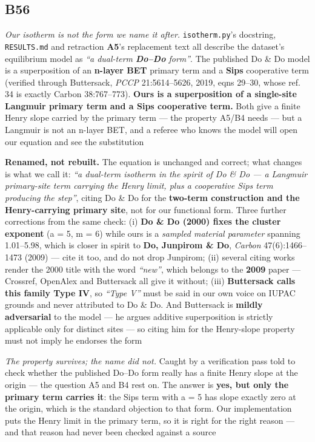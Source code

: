 \documentclass[10pt]{article}
\begin{document}
\subsection*{B56}\label{led:B56}
\begin{description}[leftmargin=0pt,itemsep=1pt]
\item[Defect.] \emph{Our isotherm is not the form we name it after.} \texttt{isotherm.py}'s docstring, \texttt{RESULTS.md} and retraction \textbf{A5}'s replacement text all describe the dataset's equilibrium model as \emph{``a dual-term \textbf{Do--Do} form''}. The published Do \& Do model is a superposition of an \textbf{n-layer BET} primary term and a \textbf{Sips} cooperative term (verified through Buttersack, \emph{PCCP} 21:5614--5626, 2019, eqns 29--30, whose ref. 34 is exactly Carbon 38:767--773). \textbf{Ours is a superposition of a single-site Langmuir primary term and a Sips cooperative term.} Both give a finite Henry slope carried by the primary term --- the property A5/B4 needs --- but a Langmuir is not an n-layer BET, and a referee who knows the model will open our equation and see the substitution
\item[Resolution.] \textbf{Renamed, not rebuilt.} The equation is unchanged and correct; what changes is what we call it: \emph{``a dual-term isotherm in the spirit of Do \& Do --- a Langmuir primary-site term carrying the Henry limit, plus a cooperative Sips term producing the step''}, citing Do \& Do for the \textbf{two-term construction and the Henry-carrying primary site}, not for our functional form. Three further corrections from the same check: (i) \textbf{Do \& Do (2000) fixes the cluster exponent} (a = 5, m = 6) while ours is a \emph{sampled material parameter} spanning 1.01--5.98, which is closer in spirit to \textbf{Do, Junpirom \& Do}, \emph{Carbon} 47(6):1466--1473 (2009) --- cite it too, and do not drop Junpirom; (ii) several citing works render the 2000 title with the word \emph{``new''}, which belongs to the \textbf{2009} paper --- Crossref, OpenAlex and Buttersack all give it without; (iii) \textbf{Buttersack calls this family Type IV}, so \emph{``Type V''} must be said in our own voice on IUPAC grounds and never attributed to Do \& Do. And Buttersack is \textbf{mildly adversarial} to the model --- he argues additive superposition is strictly applicable only for distinct sites --- so citing him for the Henry-slope property must not imply he endorses the form
\item[Note.] \emph{The property survives; the name did not.} Caught by a verification pass told to check whether the published Do--Do form really has a finite Henry slope at the origin --- the question A5 and B4 rest on. The answer is \textbf{yes, but only the primary term carries it}: the Sips term with a = 5 has slope exactly zero at the origin, which is the standard objection to that form. Our implementation puts the Henry limit in the primary term, so it is right for the right reason --- and that reason had never been checked against a source
\end{description}
\end{document}
